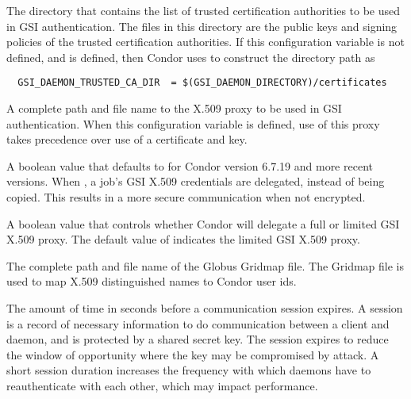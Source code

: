 \begin{description}
\label{param:GSIDaemonTrustedCADir}
\item[\Macro{GSI\_DAEMON\_TRUSTED\_CA\_DIR}]
  The directory that contains the
  list of trusted certification authorities to be used in GSI authentication.
  The files in this directory are the public keys and signing policies
  of the trusted certification authorities.
  If this configuration variable is not defined, and
   is defined, then Condor uses
   to construct the directory path as
  \begin{verbatim}
  GSI_DAEMON_TRUSTED_CA_DIR  = $(GSI_DAEMON_DIRECTORY)/certificates
  \end{verbatim}

\label{param:GSIDaemonProxy}
\item[\Macro{GSI\_DAEMON\_PROXY}]
  A complete path and file name to the
  X.509 proxy to be used in GSI authentication.
  When this configuration variable is defined, use of this proxy
  takes precedence over use of a certificate and key.

\label{param:DelegateJobGSICredentials} 
\item[\Macro{DELEGATE\_JOB\_GSI\_CREDENTIALS}]
  A boolean value that defaults to  for Condor version 6.7.19
  and more recent versions.
  When , a job's GSI X.509 credentials are delegated,
  instead of being copied.
  This results in a more secure communication when not encrypted.

\label{param:DelegateFullJobGSICredentials} 
\item[\Macro{DELEGATE\_FULL\_JOB\_GSI\_CREDENTIALS}]
  A boolean value that controls whether Condor will delegate a full or limited
  GSI X.509 proxy.  
  The default value of  indicates the limited GSI X.509 proxy.

\label{param:GridMap}
\item[\Macro{GRIDMAP}]
  The complete path and file name of the Globus Gridmap file.
  The Gridmap file is used to map
  X.509 distinguished names to Condor user ids.

\label{param:SecDefaultSessionDuration}
\item[\Macro{SEC\_<access-level>\_SESSION\_DURATION}]
  The amount of time in seconds before
  a communication session expires.
  A session is a record of necessary information to do communication
  between a client and daemon, and is protected by a shared secret key.
  The session expires to reduce the window of opportunity where
  the key may be compromised by attack.  A short session duration
  increases the frequency with which daemons have to reauthenticate
  with each other, which may impact performance.


\end{description}
